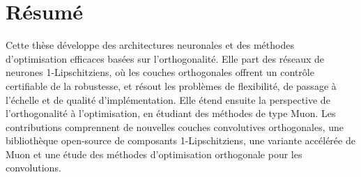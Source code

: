\chapter*{Résumé}

Cette thèse développe des architectures neuronales et des méthodes d'optimisation efficaces basées sur l'orthogonalité. Elle part des réseaux de neurones 1-Lipschitziens, où les couches orthogonales offrent un contrôle certifiable de la robustesse, et résout les problèmes de flexibilité, de passage à l'échelle et de qualité d'implémentation. Elle étend ensuite la perspective de l'orthogonalité à l'optimisation, en étudiant des méthodes de type Muon. Les contributions comprennent de nouvelles couches convolutives orthogonales, une bibliothèque open-source de composants 1-Lipschitziens, une variante accélérée de Muon et une étude des méthodes d'optimisation orthogonale pour les convolutions.
